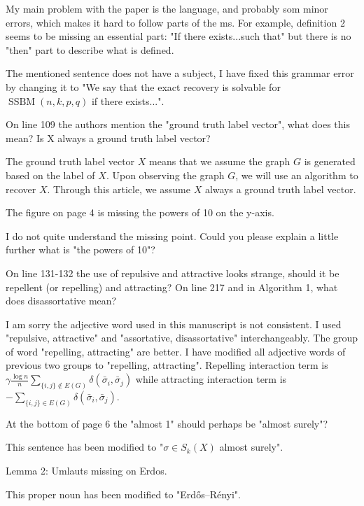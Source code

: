 \documentclass[answers]{exam}
\DeclareMathOperator{\SSBM}{SSBM}
\begin{document}
\begin{questions}
\begin{solution}
\end{solution}
\question My main problem with the paper is the language, and probably som minor errors, which makes it hard to follow parts of the ms. For example, definition 2 seems to be missing an essential part: "If there exists...such that" but there is no "then" part to describe what is defined. 
\begin{solution}
	The mentioned sentence does not have a subject, I have fixed this grammar error by changing it to
	"We say that the exact recovery is solvable for $\SSBM(n,k,p,q)$ if there exists...".
\end{solution}
\question On line 109 the authors mention the "ground truth label vector", what does this mean? Is X always a ground truth label vector? 
\begin{solution}
	The ground truth label vector $X$ means that we assume the graph $G$ is generated based on the label of $X$. Upon observing the graph $G$,
	we will use an algorithm to recover $X$. Through this article, we assume $X$ always a ground truth label vector.
\end{solution}
\question The figure on page 4 is missing the powers of 10 on the y-axis.
\begin{solution}
	I do not quite understand the missing point. Could you please explain a little further what is "the powers of 10"?
\end{solution}
\question On line 131-132 the use of repulsive and attractive looks strange, should it be repellent (or repelling) and attracting? On line 217 and in Algorithm 1, what does disassortative mean?
\begin{solution}
	I am sorry the adjective word used in this manuscript is not consistent. I used "repulsive, attractive" and "assortative, disassortative"
	interchangeably. The group of word "repelling, attracting" are better. I have modified all adjective words of previous two groups to
	"repelling, attracting". Repelling interaction term is $\gamma \frac{\log n}{n} \sum_{\{i,j\}\not\in E(G)} \delta(\bar{\sigma}_i, \bar{\sigma}_j)$
	while attracting interaction term is $- \sum_{\{i,j\}\in E(G)} \delta(\bar{\sigma}_i, \bar{\sigma}_j)$.
\end{solution}
\question At the bottom of page 6 the "almost 1" should perhaps be "almost surely"?
\begin{solution}
This sentence has been modified to "$\sigma \in S_k(X)$ almost surely".
\end{solution}
\question Lemma 2: Umlauts missing on Erdos.
\begin{solution}
This proper noun has been modified to "Erdős–Rényi".
\end{solution}


\end{questions}
\end{document}
